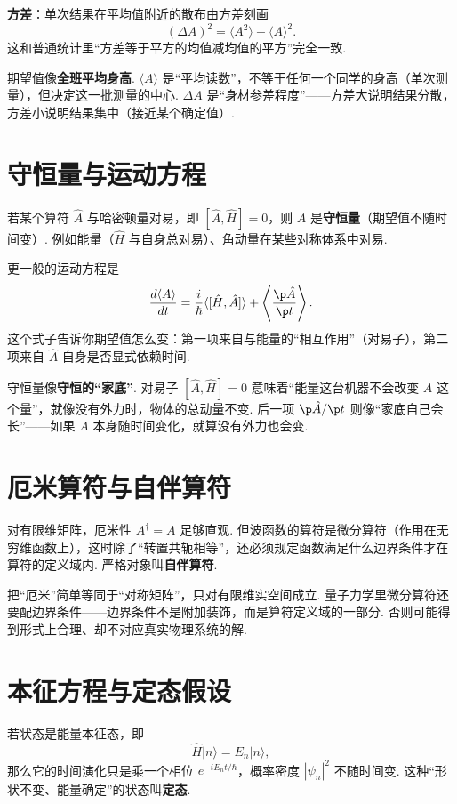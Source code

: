 \documentclass[UTF8,11pt,a4paper,openany]{ctexbook}
\newcommand{\ket}[1]{\lvert #1\rangle}\newcommand{\bra}[1]{\langle #1\rvert}
\newcommand{\term}[1]{\textbf{#1}}
\begin{document}
\textbf{方差}：单次结果在平均值附近的散布由方差刻画
\[
(\Delta A)^2=\langle A^2\rangle-\langle A\rangle^2.
\]
这和普通统计里“方差等于平方的均值减均值的平方”完全一致. 

\begin{analogybox}
期望值像\textbf{全班平均身高}. $\langle A\rangle$ 是“平均读数”，不等于任何一个同学的身高（单次测量），但决定这一批测量的中心. $\Delta A$ 是“身材参差程度”——方差大说明结果分散，方差小说明结果集中（接近某个确定值）. 
\end{analogybox}

\section{守恒量与运动方程}
若某个算符 $\hat A$ 与哈密顿量对易，即 $[\hat A,\hat H]=0$，则 $A$ 是\term{守恒量}（期望值不随时间变）. 例如能量（$\hat H$ 与自身总对易）、角动量在某些对称体系中对易. 

更一般的运动方程是
\[
\frac{d\langle A\rangle}{dt}=\frac{i}{\hbar}\langle[\hat H,\hat A]\rangle+\left\langle\frac{\p\hat A}{\p t}\right\rangle.
\]
这个式子告诉你期望值怎么变：第一项来自与能量的“相互作用”（对易子），第二项来自 $\hat A$ 自身是否显式依赖时间. 

\begin{analogybox}
守恒量像\textbf{守恒的“家底”}. 对易子 $[\hat A,\hat H]=0$ 意味着“能量这台机器不会改变 $A$ 这个量”，就像没有外力时，物体的总动量不变. 后一项 $\p\hat A/\p t$ 则像“家底自己会长”——如果 $A$ 本身随时间变化，就算没有外力也会变. 
\end{analogybox}

\section{厄米算符与自伴算符}
对有限维矩阵，厄米性 $A^\dagger=A$ 足够直观. 但波函数的算符是微分算符（作用在无穷维函数上），这时除了“转置共轭相等”，还必须规定函数满足什么边界条件才在算符的定义域内. 严格对象叫\term{自伴算符}. 

\begin{limitbox}
把“厄米”简单等同于“对称矩阵”，只对有限维实空间成立. 量子力学里微分算符还要配边界条件——边界条件不是附加装饰，而是算符定义域的一部分. 否则可能得到形式上合理、却不对应真实物理系统的解. 
\end{limitbox}

\section{本征方程与定态假设}
若状态是能量本征态，即
\[
\hat H\ket n=E_n\ket n,
\]
那么它的时间演化只是乘一个相位 $e^{-iE_nt/\hbar}$，概率密度 $|\psi_n|^2$ 不随时间变. 这种“形状不变、能量确定”的状态叫\term{定态}. 
\end{document}
